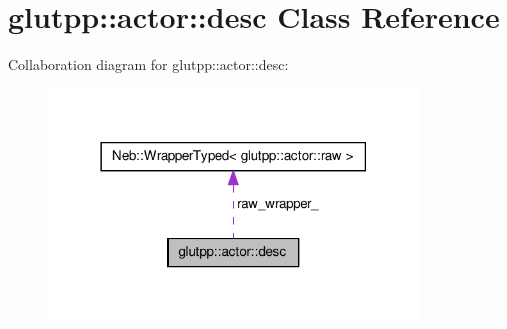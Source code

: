 \hypertarget{classglutpp_1_1actor_1_1desc}{\section{glutpp\-:\-:actor\-:\-:desc \-Class \-Reference}
\label{classglutpp_1_1actor_1_1desc}
}


\-Collaboration diagram for glutpp\-:\-:actor\-:\-:desc\-:
\nopagebreak
\begin{figure}[H]
\begin{center}
\leavevmode
\includegraphics[width=278pt]{classglutpp_1_1actor_1_1desc__coll__graph}
\end{center}
\end{figure}
